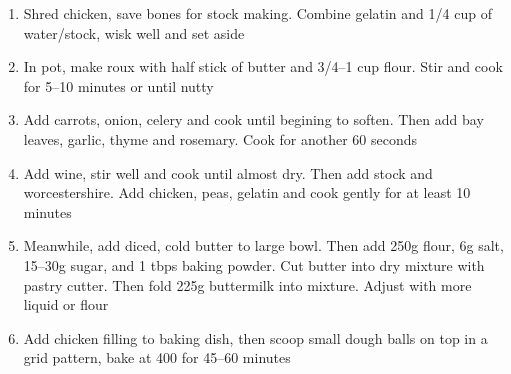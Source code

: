 \documentclass[]{report}
\begin{document}
            {\begin{enumerate}    %
                  \item  Shred chicken, save bones for stock making. Combine gelatin and 1/4 cup of water/stock, wisk well and set aside 
                  \item In pot, make roux with half stick of butter and 3/4--1 cup flour. Stir and cook for 5--10 minutes or until nutty
                  \item Add carrots, onion, celery and cook until begining to soften. Then add bay leaves, garlic, thyme and rosemary. Cook for another 60 seconds
                  \item Add wine, stir well and cook until almost dry. Then add stock and worcestershire. Add chicken, peas, gelatin and cook gently for at least 10 minutes
                  \item Meanwhile, add diced, cold butter to large bowl. Then add 250g flour, 6g salt, 15--30g sugar, and 1 tbps baking powder. Cut butter into dry mixture with pastry cutter. Then fold 225g buttermilk into mixture. Adjust with more liquid or flour 
                  \item  Add chicken filling to baking dish, then scoop small dough balls on top in a grid pattern, bake at 400 for 45--60 minutes 
            \end{enumerate}}
            
\end{document}
